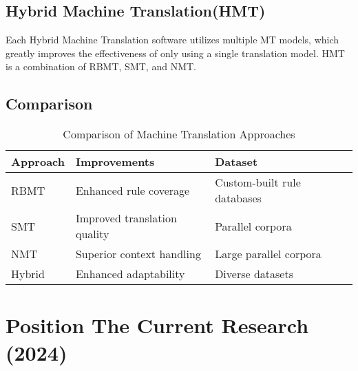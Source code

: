 \documentclass[sigconf]{acmart}
\begin{document}
     \subsection{Hybrid Machine Translation(HMT)}
        Each Hybrid Machine Translation software utilizes multiple MT models, which greatly improves the effectiveness of only using a single translation model. HMT is a combination of RBMT, SMT, and NMT.

    \subsection{Comparison}
        \begin{table}[ht]
        \caption{Comparison of Machine Translation Approaches}
        \label{table:mt_comparison}
        \centering
        \begin{tabular}{|l|l|l|l|}
        \hline
        \textbf{Approach} &  \textbf{Improvements} & \textbf{Dataset} \\
        \hline
            RBMT &  Enhanced rule coverage & Custom-built rule databases \\
        \hline
            SMT &  Improved translation quality & Parallel corpora \\
        \hline
            NMT &  Superior context handling & Large parallel corpora \\
        \hline
            Hybrid &  Enhanced adaptability & Diverse datasets \\
        \hline
        \end{tabular}
        \end{table}

\section{Position The Current Research (2024)} %



    
\end{document}
